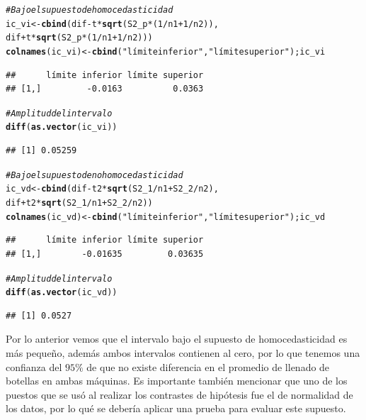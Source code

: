 \documentclass[a4paper]{scrartcl}\usepackage[]{graphicx}\usepackage[]{color}
\makeatletter
\newcommand{\hlnum}[1]{\textcolor[rgb]{0.686,0.059,0.569}{#1}}%
\newcommand{\hlstr}[1]{\textcolor[rgb]{0.192,0.494,0.8}{#1}}%
\newcommand{\hlcom}[1]{\textcolor[rgb]{0.678,0.584,0.686}{\textit{#1}}}%
\newcommand{\hlopt}[1]{\textcolor[rgb]{0,0,0}{#1}}%
\newcommand{\hlstd}[1]{\textcolor[rgb]{0.345,0.345,0.345}{#1}}%
\newcommand{\hlkwb}[1]{\textcolor[rgb]{0.69,0.353,0.396}{#1}}%
\newcommand{\hlkwd}[1]{\textcolor[rgb]{0.737,0.353,0.396}{\textbf{#1}}}%
\newenvironment{kframe}{%
 \def\at@end@of@kframe{}%
 \ifinner\ifhmode%
  \def\at@end@of@kframe{\end{minipage}}%
  \begin{minipage}{\columnwidth}%
 \fi\fi%
 \def\FrameCommand##1{\hskip\@totalleftmargin \hskip-\fboxsep
 \colorbox{shadecolor}{##1}\hskip-\fboxsep
     \hskip-\linewidth \hskip-\@totalleftmargin \hskip\columnwidth}%
 \MakeFramed {\advance\hsize-\width
   \@totalleftmargin\z@ \linewidth\hsize
   \@setminipage}}%
 {\par\unskip\endMakeFramed%
 \at@end@of@kframe}
\newenvironment{knitrout}{}{} %
\makeatother
\begin{document}
\begin{knitrout}
\color{fgcolor}\begin{kframe}
\begin{alltt}
\hlcom{# Bajo el supuesto de homocedasticidad}
\hlstd{ic_vi} \hlkwb{<-} \hlkwd{cbind}\hlstd{(dif} \hlopt{-} \hlstd{t} \hlopt{*} \hlkwd{sqrt}\hlstd{(S2_p}\hlopt{*}\hlstd{(}\hlnum{1}\hlopt{/}\hlstd{n1} \hlopt{+} \hlnum{1}\hlopt{/}\hlstd{n2)),}
               \hlstd{dif} \hlopt{+} \hlstd{t} \hlopt{*} \hlkwd{sqrt}\hlstd{(S2_p}\hlopt{*}\hlstd{(}\hlnum{1}\hlopt{/}\hlstd{n1} \hlopt{+} \hlnum{1}\hlopt{/}\hlstd{n2)))}
\hlkwd{colnames}\hlstd{(ic_vi)} \hlkwb{<-} \hlkwd{cbind}\hlstd{(}\hlstr{"límite inferior"}\hlstd{,}\hlstr{"límite superior"}\hlstd{);ic_vi}
\end{alltt}
\begin{verbatim}
##      límite inferior límite superior
## [1,]         -0.0163          0.0363
\end{verbatim}
\begin{alltt}
\hlcom{# Amplitud del intervalo}
\hlkwd{diff}\hlstd{(}\hlkwd{as.vector}\hlstd{(ic_vi))}
\end{alltt}
\begin{verbatim}
## [1] 0.05259
\end{verbatim}
\begin{alltt}
\hlcom{# Bajo el supuesto de no homocedasticidad}
\hlstd{ic_vd} \hlkwb{<-} \hlkwd{cbind}\hlstd{(dif} \hlopt{-} \hlstd{t2} \hlopt{*} \hlkwd{sqrt}\hlstd{(S2_1}\hlopt{/}\hlstd{n1} \hlopt{+} \hlstd{S2_2}\hlopt{/}\hlstd{n2),}
               \hlstd{dif} \hlopt{+} \hlstd{t2} \hlopt{*} \hlkwd{sqrt}\hlstd{(S2_1}\hlopt{/}\hlstd{n1} \hlopt{+} \hlstd{S2_2}\hlopt{/}\hlstd{n2))}
\hlkwd{colnames}\hlstd{(ic_vd)} \hlkwb{<-} \hlkwd{cbind}\hlstd{(}\hlstr{"límite inferior"}\hlstd{,}\hlstr{"límite superior"}\hlstd{);ic_vd}
\end{alltt}
\begin{verbatim}
##      límite inferior límite superior
## [1,]        -0.01635         0.03635
\end{verbatim}
\begin{alltt}
\hlcom{# Amplitud del intervalo}
\hlkwd{diff}\hlstd{(}\hlkwd{as.vector}\hlstd{(ic_vd))}
\end{alltt}
\begin{verbatim}
## [1] 0.0527
\end{verbatim}
\end{kframe}
\end{knitrout}

\noindent Por lo anterior vemos que el intervalo bajo el supuesto de homocedasticidad es más pequeño, además ambos intervalos contienen al cero, por lo que tenemos una confianza del $95\%$ de que no existe diferencia en el promedio de llenado de botellas en ambas máquinas. Es importante también mencionar que uno de los puestos que se usó al realizar los contrastes de hipótesis fue el de normalidad de los datos, por lo qué se debería aplicar una prueba para evaluar este supuesto.
\end{document}
